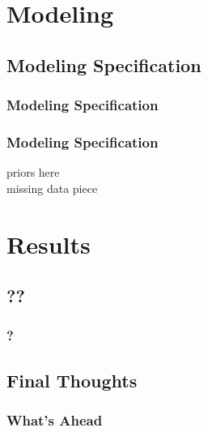 \documentclass{beamer}
\begin{document}
\section{Modeling}
\subsection{Modeling Specification}
\begin{frame}
	\frametitle{Modeling Specification}

\end{frame}
\begin{frame}
	\frametitle{Modeling Specification}
	priors here \\
	missing data piece
\end{frame}
\section{Results}
\subsection{??}
\begin{frame}
	\frametitle{?}

\end{frame}


\subsection{Final Thoughts}
\begin{frame}
	\frametitle{What's Ahead}

\end{frame}
\end{document}
